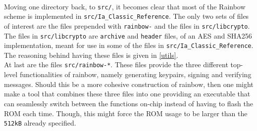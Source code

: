 \medskip\\
Moving one directory back, to \texttt{src/}, it becomes clear that most of the Rainbow scheme is implemented in \texttt{src/Ia\_Classic\_Reference}. The only two sets of files of interest are the files prepended with \texttt{rainbow-} and the files in \texttt{src/libcrypto}. The files in \texttt{src/libcrypto} are \texttt{archive} and \texttt{header} files, of an AES and SHA256 implementation, meant for use in some of the files in \texttt{src/Ia\_Classic\_Reference}. The reasoning behind having these files is given in \cref{utils}.\medskip\\
At last are the files \texttt{src/rainbow-*}. These files provide the three different top-level functionalities of rainbow, namely generating keypairs, signing and verifying messages. Should this be a more cohesive construction of rainbow, then one might make a tool that combines these three files into one providing an executable that can seamlessly switch between the functions on-chip instead of having to flash the ROM each time. Though, this might force the ROM usage to be larger than the \texttt{512kB} already specified.
